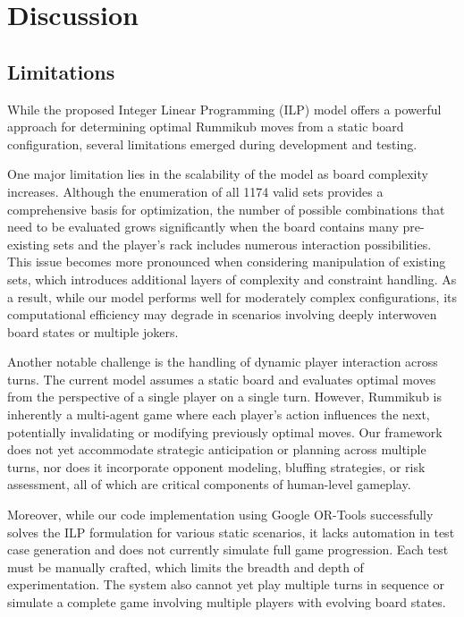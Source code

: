 \documentclass[11pt,letterpaper]{article}
\begin{document}
\section*{Discussion}

\subsection*{Limitations}

While the proposed Integer Linear Programming (ILP) model offers a powerful approach for determining optimal Rummikub moves from a static board configuration, several limitations emerged during development and testing.

One major limitation lies in the scalability of the model as board complexity increases. Although the enumeration of all 1174 valid sets provides a comprehensive basis for optimization, the number of possible combinations that need to be evaluated grows significantly when the board contains many pre-existing sets and the player’s rack includes numerous interaction possibilities. This issue becomes more pronounced when considering manipulation of existing sets, which introduces additional layers of complexity and constraint handling. As a result, while our model performs well for moderately complex configurations, its computational efficiency may degrade in scenarios involving deeply interwoven board states or multiple jokers.

Another notable challenge is the handling of dynamic player interaction across turns. The current model assumes a static board and evaluates optimal moves from the perspective of a single player on a single turn. However, Rummikub is inherently a multi-agent game where each player’s action influences the next, potentially invalidating or modifying previously optimal moves. Our framework does not yet accommodate strategic anticipation or planning across multiple turns, nor does it incorporate opponent modeling, bluffing strategies, or risk assessment, all of which are critical components of human-level gameplay.

Moreover, while our code implementation using Google OR-Tools successfully solves the ILP formulation for various static scenarios, it lacks automation in test case generation and does not currently simulate full game progression. Each test must be manually crafted, which limits the breadth and depth of experimentation. The system also cannot yet play multiple turns in sequence or simulate a complete game involving multiple players with evolving board states.
\end{document}

